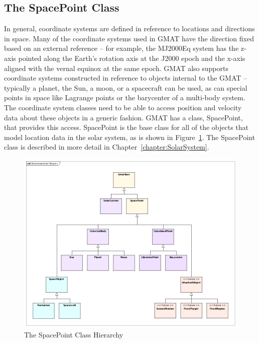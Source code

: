 \subsection{\label{sub:SpacePointClassDescription}The SpacePoint Class}

In general, coordinate systems are defined in reference to locations and directions in space. Many
of the coordinate systems used in GMAT have the direction fixed based on an external reference --
for example, the MJ2000Eq system has the z-axis pointed along the Earth's rotation axis at the J2000
epoch and the x-axis aligned with the vernal equinox at the same epoch. GMAT also supports
coordinate systems constructed in reference to objects internal to the GMAT -- typically a planet,
the Sun, a moon, or a spacecraft can be used, as can special points in space like Lagrange points or
the barycenter of a multi-body system.  The coordinate system classes need to be able to access
position and velocity data about these objects in a generic fashion. GMAT has a class, SpacePoint,
that provides this access. SpacePoint is the base class for all of the objects that model location
data in the solar system, as is shown in Figure~\ref{figure:SpacePointHierarchy}.  The SpacePoint
class is described in more detail in Chapter~\ref{chapter:SolarSystem}.

\begin{figure}
\begin{center}
\includegraphics[450,190]{Images/EnvironmentalObjects.png}
\caption{\label{figure:SpacePointHierarchy}The SpacePoint Class Hierarchy}
\end{center}
\end{figure}

